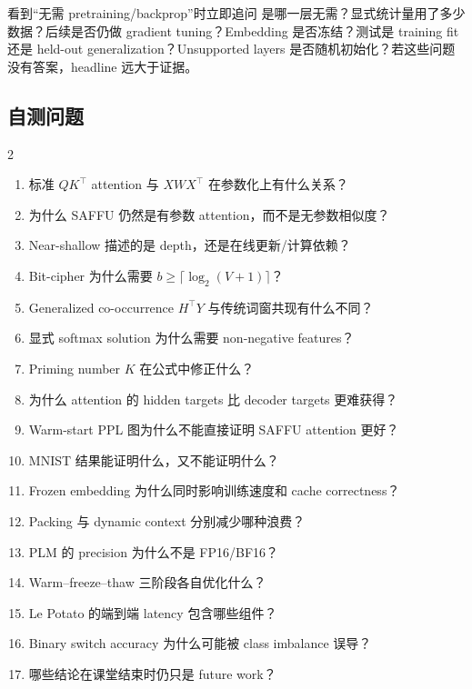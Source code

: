 \begin{warningbox}{看到“无需 pretraining/backprop”时立即追问}
是哪一层无需？显式统计量用了多少数据？后续是否仍做 gradient tuning？Embedding 是否冻结？测试是 training fit 还是 held-out generalization？Unsupported layers 是否随机初始化？若这些问题没有答案，headline 远大于证据。
\end{warningbox}

\subsection{自测问题}

\begin{multicols}{2}
\small
\begin{enumerate}
  \item 标准 $QK^\top$ attention 与 $XWX^\top$ 在参数化上有什么关系？
  \item 为什么 SAFFU 仍然是有参数 attention，而不是无参数相似度？
  \item Near-shallow 描述的是 depth，还是在线更新/计算依赖？
  \item Bit-cipher 为什么需要 $b\ge\lceil\log_2(V+1)\rceil$？
  \item Generalized co-occurrence $H^\top Y$ 与传统词窗共现有什么不同？
  \item 显式 softmax solution 为什么需要 non-negative features？
  \item Priming number $K$ 在公式中修正什么？
  \item 为什么 attention 的 hidden targets 比 decoder targets 更难获得？
  \item Warm-start PPL 图为什么不能直接证明 SAFFU attention 更好？
  \item MNIST 结果能证明什么，又不能证明什么？
  \item Frozen embedding 为什么同时影响训练速度和 cache correctness？
  \item Packing 与 dynamic context 分别减少哪种浪费？
  \item PLM 的 precision 为什么不是 FP16/BF16？
  \item Warm--freeze--thaw 三阶段各自优化什么？
  \item Le Potato 的端到端 latency 包含哪些组件？
  \item Binary switch accuracy 为什么可能被 class imbalance 误导？
  \item 哪些结论在课堂结束时仍只是 future work？
\end{enumerate}
\end{multicols}

